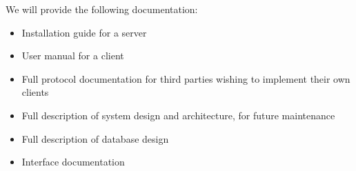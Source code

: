 We will provide the following documentation:
\begin{itemize}
\item Installation guide for a server
\item User manual for a client
\item Full protocol documentation for third parties wishing to implement their
      own clients
\item Full description of system design and architecture, for future
      maintenance
\item Full description of database design
\item Interface documentation
\end{itemize}
